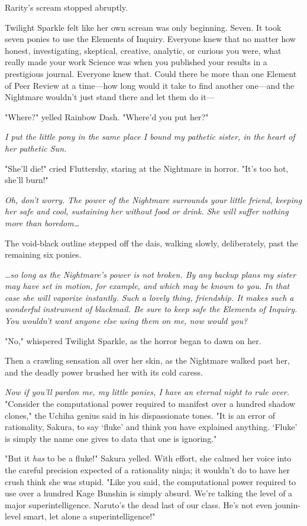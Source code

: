 Rarity's scream stopped abruptly.

Twilight Sparkle felt like her own scream was only beginning. Seven. It took 
seven ponies to use the Elements of Inquiry. Everyone knew that no matter how 
honest, investigating, skeptical, creative, analytic, or curious you were, what 
really made your work Science was when you published your results in a 
prestigious journal. Everyone knew that. Could there be more than one Element 
of Peer Review at a time---how long would it take to find another one---and the 
Nightmare wouldn't just stand there and let them do it---

"Where?" yelled Rainbow Dash. "Where'd you put her?"

\emph{I put the little pony in the same place I bound my pathetic sister, in 
the heart of her pathetic Sun.}

"She'll die!" cried Fluttershy, staring at the Nightmare in horror. "It's too 
hot, she'll burn!"

\emph{Oh, don't worry. The power of the Nightmare surrounds your little friend, 
keeping her safe and cool, sustaining her without food or drink. She will 
suffer nothing more than boredom{\ldots}}

The void-black outline stepped off the dais, walking slowly, deliberately, past 
the remaining six ponies.

\emph{{\ldots}so long as the Nightmare's power is not broken. By any backup 
plans my sister may have set in motion, for example, and which may be known to 
you. In that case she will vaporize instantly. Such a lovely thing, friendship. 
It makes such a wonderful instrument of blackmail. Be sure to keep safe the 
Elements of Inquiry. You wouldn't want anyone else using them on me, now would 
you?}

"No," whispered Twilight Sparkle, as the horror began to dawn on her.

Then a crawling sensation all over her skin, as the Nightmare walked past her, 
and the deadly power brushed her with its cold caress.

\emph{Now if you'll pardon me, my little ponies, I have an eternal night to 
rule over.}
\sbreak
"Consider the computational power required to manifest over a hundred shadow 
clones," the Uchiha genius said in his dispassionate tones. "It is an error of 
rationality, Sakura, to say `fluke' and think you have explained anything. 
`Fluke' is simply the name one gives to data that one is ignoring."

"But it \emph{has} to be a fluke!" Sakura yelled. With effort, she calmed her 
voice into the careful precision expected of a rationality ninja; it wouldn't 
do to have her crush think she was stupid. "Like you said, the computational 
power required to use over a hundred Kage Bunshin is simply absurd. We're 
talking the level of a major superintelligence. Naruto's the dead last of our 
class. He's not even jounin-level smart, let alone a superintelligence!"

